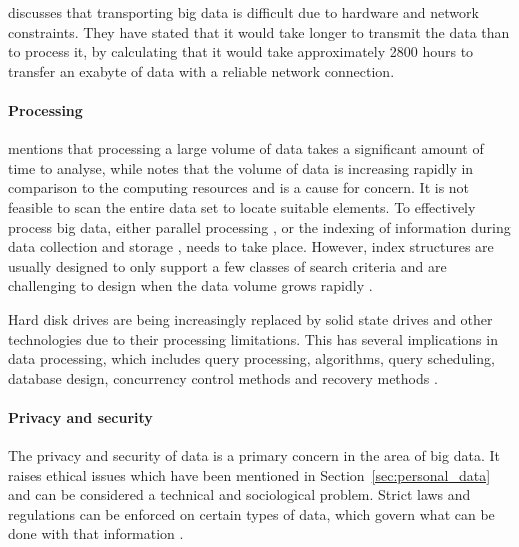 \documentclass[
	fontsize=11pt
	headlines=2,
	footlines=2,
	parskip=half
]{scrartcl}
\begin{document}
{{{{					\citet{kaisler2013big} discusses that transporting big data is difficult due to hardware and network constraints. They have stated that it would take longer to transmit the data than to process it, by calculating that it would take approximately 2800 hours to transfer an exabyte of data with a reliable network connection.
				
				}

				\paragraph{Processing} {
				
					\citet{labrinidis2012challenges} mentions that processing a large volume of data takes a significant amount of time to analyse, while \citet{katal2013big} notes that the volume of data is increasing rapidly in comparison to the computing resources and is a cause for concern. It is not feasible to scan the entire data set to locate suitable elements. To effectively process big data, either parallel processing \citep{kaisler2013big}, or the indexing of information during data collection and storage \citep{katal2013big} \citep{labrinidis2012challenges}, needs to take place. However, index structures are usually designed to only support a few classes of search criteria and are challenging to design when the data volume grows rapidly \citep{labrinidis2012challenges}.
					
					Hard disk drives are being increasingly replaced by solid state drives and other technologies due to their processing limitations. This has several implications in data processing, which includes query processing, algorithms, query scheduling, database design, concurrency control methods and recovery methods \citep{labrinidis2012challenges}.
					
				}
				
				\paragraph{Privacy and security} {
				
					The privacy and security of data is a primary concern in the area of big data. It raises ethical issues which have been mentioned in Section~\ref{sec:personal_data} and can be considered a technical and sociological problem. Strict laws and regulations can be enforced on certain types of data, which govern what can be done with that information \citep{labrinidis2012challenges}. 
					
}}}}
\end{document}
